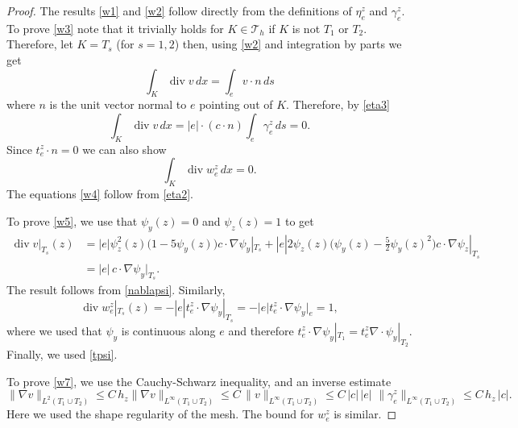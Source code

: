 \documentclass[11pt]{amsart}
\numberwithin{equation}{section}
\newcommand{\dive}{\operatorname{div}}
\newcommand{\Th}{\mathcal{T}_h}
\theoremstyle{definition}
\begin{document}
\begin{proof}
The results \eqref{w1} and \eqref{w2} follow directly from the definitions of $\eta_e^z$ and $\gamma_e^z$.  To prove \eqref{w3} note that it trivially holds for $K \in \Th$ if $K$ is not $T_1$ or $T_2$. Therefore, let $K=T_s$ (for $s=1, 2$) then, using  \eqref{w2}  and integration by parts we get
\begin{equation*}
 \int_K \dive v \, dx = \int_{e}  v \cdot n \, ds
\end{equation*}
where $n$ is the unit vector normal to $e$ pointing out of $K$.
Therefore,  by \eqref{eta3} 
\begin{equation*}
 \int_K \dive v \, dx  = |e| \cdot (c \cdot n) \int_{e} \gamma_e^z \, ds=0.
\end{equation*}
Since $t_e^z \cdot n =0$ we can also show
\begin{equation*}
 \int_K \dive w_e^z\, dx= 0.
\end{equation*}
The equations \eqref{w4} follow from \eqref{eta2}. 

To prove \eqref{w5}, we use that $\psi_y(z)=0$  and $\psi_z(z)=1$ to get 
\begin{equation*}
\begin{split}
\dive v|_{T_s}(z) &= |e| \psi_z^2(z) \big(1- 5 \psi_y(z)\big) c \cdot\nabla\psi_y|_{T_s} 
+|e|2 \psi_z(z)\big(\psi_y(z)-\frac{5}{2} \psi_y(z)^2\big) c \cdot\nabla\psi_z|_{T_s} \\
&=|e| \, c \cdot \nabla  \psi_y|_{T_s}.
\end{split}
\end{equation*}
The result follows from \eqref{nablapsi}.
Similarly, 
\begin{equation*}
 \dive w_e^z |_{T_s} (z)= -|e| t_e^z \cdot \nabla \psi_y|_{T_s}  =-|e| t_e^z \cdot  \nabla \psi_y|_{e} = 1,  
\end{equation*}
where we used that $\psi_y$ is continuous along $e$ and therefore $ t_e^z \cdot \nabla \psi_y|_{T_1}= t_e^z \nabla  \cdot \psi_y|_{T_2}$. Finally, we used \eqref{tpsi}. 

To prove \eqref{w7}, we use the Cauchy-Schwarz inequality, and an inverse estimate
\begin{equation*}
\|\nabla v\|_{L^2(T_1 \cup T_2)} \le C \, h_z \|\nabla v\|_{L^\infty(T_1 \cup T_2)}  \le C \, \|v\|_{L^\infty(T_1 \cup T_2)}  \le C \, |c| \, |e|\,  \, \|\gamma_e^z\|_{L^\infty(T_1 \cup T_2)}  \le  C \, h_z\, |c|.
\end{equation*}
Here we used the shape regularity of the mesh.  The bound for $w_e^z$ is similar.
\end{proof}
\end{document}
